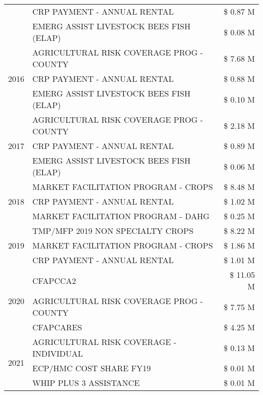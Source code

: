 \begin{tabular}{llr}
 & CRP PAYMENT - ANNUAL RENTAL & \$ 0.87 M \\
 & EMERG ASSIST LIVESTOCK BEES FISH (ELAP) & \$ 0.08 M \\
\cline{1-3}
\multirow[t]{3}{*}{2016} & AGRICULTURAL RISK COVERAGE PROG - COUNTY & \$ 7.68 M \\
 & CRP PAYMENT - ANNUAL RENTAL & \$ 0.88 M \\
 & EMERG ASSIST LIVESTOCK BEES FISH (ELAP) & \$ 0.10 M \\
\cline{1-3}
\multirow[t]{3}{*}{2017} & AGRICULTURAL RISK COVERAGE PROG - COUNTY & \$ 2.18 M \\
 & CRP PAYMENT - ANNUAL RENTAL & \$ 0.89 M \\
 & EMERG ASSIST LIVESTOCK BEES FISH (ELAP) & \$ 0.06 M \\
\cline{1-3}
\multirow[t]{3}{*}{2018} & MARKET FACILITATION PROGRAM - CROPS & \$ 8.48 M \\
 & CRP PAYMENT - ANNUAL RENTAL & \$ 1.02 M \\
 & MARKET FACILITATION PROGRAM - DAHG & \$ 0.25 M \\
\cline{1-3}
\multirow[t]{3}{*}{2019} & TMP/MFP 2019 NON SPECIALTY CROPS & \$ 8.22 M \\
 & MARKET FACILITATION PROGRAM - CROPS & \$ 1.86 M \\
 & CRP PAYMENT - ANNUAL RENTAL & \$ 1.01 M \\
\cline{1-3}
\multirow[t]{3}{*}{2020} & CFAPCCA2 & \$ 11.05 M \\
 & AGRICULTURAL RISK COVERAGE PROG - COUNTY & \$ 7.75 M \\
 & CFAPCARES & \$ 4.25 M \\
\cline{1-3}
\multirow[t]{3}{*}{2021} & AGRICULTURAL RISK COVERAGE - INDIVIDUAL & \$ 0.13 M \\
 & ECP/HMC COST SHARE FY19 & \$ 0.01 M \\
 & WHIP PLUS 3 ASSISTANCE & \$ 0.01 M \\
\cline{1-3}
\bottomrule
\end{tabular}
